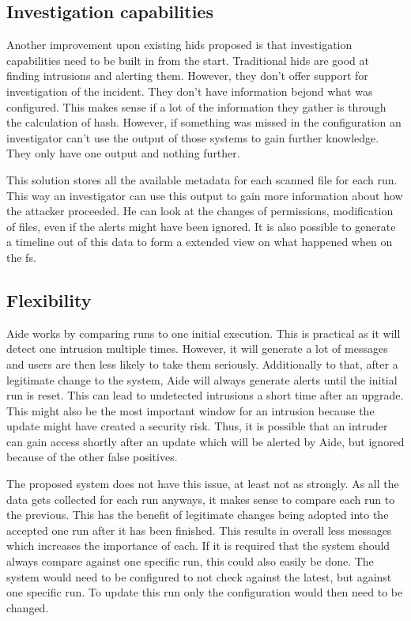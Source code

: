 \subsection{Investigation capabilities}
\label{sec:investigation:capabilities}
Another improvement upon existing \gls{hids} proposed is that investigation capabilities need to be built in from the start. Traditional \gls{hids} are good at finding intrusions and alerting them. However, they don't offer support for investigation of the incident. They don't have information bejond what was configured. This makes sense if a lot of the information they gather is through the calculation of \gls{hash}. However, if something was missed in the configuration an investigator can't use the output of those systems to gain further knowledge. They only have one output and nothing further.

This solution stores all the available \gls{metadata} for each scanned file for each run. This way an investigator can use this output to gain more information about how the attacker proceeded. He can look at the changes of permissions, modification of files, even if the alerts might have been ignored. It is also possible to generate a timeline out of this data to form a extended view on what happened when on the \gls{fs}. 

\subsection{Flexibility}

Aide works by comparing runs to one initial execution. This is practical as it will detect one intrusion multiple times. However, it will generate a lot of messages and users are then less likely to take them seriously. Additionally to that, after a legitimate change to the system, Aide will always generate alerts until the initial run is reset. This can lead to undetected intrusions a short time after an upgrade. This might also be the most important window for an intrusion because the update might have created a security risk. Thus, it is possible that an intruder can gain access shortly after an update which will be alerted by Aide, but ignored because of the other false positives.

The proposed system does not have this issue, at least not as strongly. As all the data gets collected for each run anyways, it makes sense to compare each run to the previous. This has the benefit of legitimate changes being adopted into the accepted one run after it has been finished. This results in overall less messages which increases the importance of each. If it is required that the system should always compare against one specific run, this could also easily be done. The system would need to be configured to not check against the latest, but against one specific run. To update this run only the configuration would then need to be changed. 

